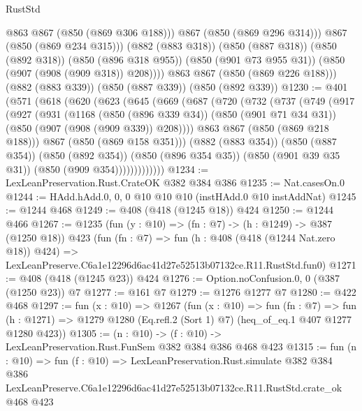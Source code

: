 \begin{lexlean}{RustStd}
\begin{coremodule}
                @863
                @867
                (@850 (@869 @306 @188)))
              @867
              (@850 (@869 @296 @314)))
            @867
            (@850 (@869 @234 @315)))
          (@882 (@883 @318))
          (@850 (@887 @318))
          (@850 (@892 @318))
          (@850 (@896 @318 @955))
          (@850 (@901 @73 @955 @31))
          (@850 (@907 (@908 (@909 @318)) @208))))
      @863
      @867
      (@850 (@869 @226 @188)))
    (@882 (@883 @339))
    (@850 (@887 @339))
    (@850 (@892 @339))
@1230 := @401
    (@571
      (@618
        (@620
          (@623
            (@645
              (@669
                (@687
                  (@720
                    (@732
                      (@737
                        (@749
                          (@917
                            (@927
                              (@931
                                (@1168
                                  (@850 (@896 @339 @34))
                                  (@850 (@901 @71 @34 @31))
                                  (@850 (@907 (@908 (@909 @339)) @208))))
                              @863
                              @867
                              (@850 (@869 @218 @188)))
                            @867
                            (@850 (@869 @158 @351)))
                          (@882 (@883 @354))
                          (@850 (@887 @354))
                          (@850 (@892 @354))
                          (@850 (@896 @354 @35))
                          (@850 (@901 @39 @35 @31))
                          (@850 (@909 @354)))))))))))))
@1234 := LexLeanPreservation.Rust.CrateOK @382 @384 @386
@1235 := Nat.casesOn.{0}
@1244 := HAdd.hAdd.{0, 0, 0} @10 @10 @10 (instHAdd.{0} @10 instAddNat)
@1245 := @1244 @468
@1249 := @408 (@418 (@1245 @18)) @424
@1250 := @1244 @466
@1267 := @1235
    (fun (y : @10) => (fn : @7) -> (h : @1249) -> @387 (@1250 @18))
    @423
    (fun (fn : @7) =>
    fun (h : @408 (@418 (@1244 Nat.zero @18)) @424) =>
    LexLeanPreserve.C6a1e12296d6ac41d27e52513b07132ce.R11.RustStd.fun0)
@1271 := @408 (@418 (@1245 @23)) @424
@1276 := Option.noConfusion.{0, 0} (@387 (@1250 @23)) @7
@1277 := @161 @7
@1279 := @1276 @1277 @7
@1280 := @422 @468
@1297 := fun (x : @10) =>
  @1267
    (fun (x : @10) =>
    fun (fn : @7) =>
    fun (h : @1271) => @1279 @1280 (Eq.refl.{2} (Sort 1) @7) (heq_of_eq.{1} @407 @1277 @1280 @423))
@1305 := (n : @10) -> (f : @10) -> LexLeanPreservation.Rust.FunSem @382 @384 @386 @468 @423
@1315 := fun (n : @10) =>
  fun (f : @10) =>
  LexLeanPreservation.Rust.simulate
    @382
    @384
    @386
    LexLeanPreserve.C6a1e12296d6ac41d27e52513b07132ce.R11.RustStd.crate_ok
    @468
    @423
\end{coremodule}
\end{lexlean}
